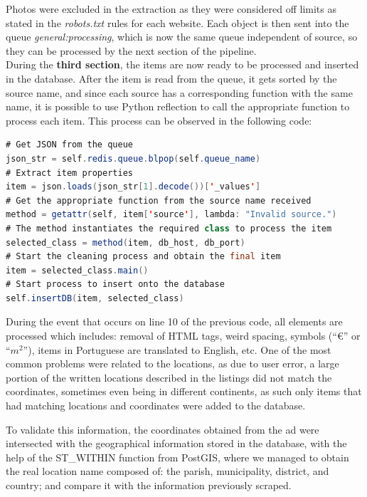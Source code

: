 Photos were excluded in the extraction as they were considered off limits as stated in the \textit{robots.txt} rules for each website. Each object is then sent into the queue \textit{general:processing}, which is now the same queue independent of source, so they can be processed by the next section of the pipeline. \\

During the \textbf{third section}, the items are now ready to be processed and inserted in the database. After the item is read from the queue, it gets sorted by the source name, and since each source has a corresponding function with the same name, it is possible to use Python reflection to call the appropriate function to process each item. This process can be observed in the following code: \\

\begin{lstlisting}[language=Java, caption={Snipet of code responsible for selecting the appropriate path for each item}, captionpos=t]
# Get JSON from the queue
json_str = self.redis.queue.blpop(self.queue_name)
# Extract item properties
item = json.loads(json_str[1].decode())['_values']
# Get the appropriate function from the source name received
method = getattr(self, item['source'], lambda: "Invalid source.")
# The method instantiates the required class to process the item 
selected_class = method(item, db_host, db_port)
# Start the cleaning process and obtain the final item
item = selected_class.main()
# Start process to insert onto the database
self.insertDB(item, selected_class)
\end{lstlisting}

During the event that occurs on line 10 of the previous code, all elements are processed which includes: removal of HTML tags, weird spacing, symbols (``€'' or ``$m^2$''), items in Portuguese are translated to English, etc. One of the most common problems were related to the locations, as due to user error, a large portion of the written locations described in the listings did not match the coordinates, sometimes even being in different continents, as such only items that had matching locations and coordinates were added to the database.

To validate this information, the coordinates obtained from the ad were intersected with the geographical information stored in the database, with the help of the ST\_WITHIN function from PostGIS, where we managed to obtain the real location name composed of: the parish, municipality, district, and country; and compare it with the information previously scraped.

